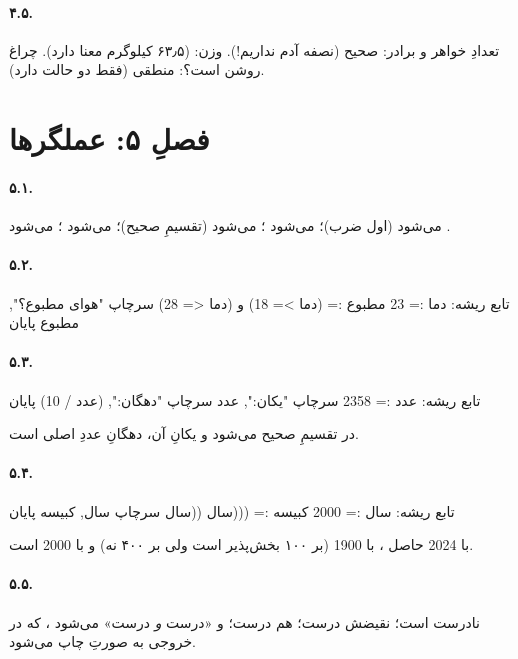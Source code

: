 \paragraph{۴.۵.} تعدادِ خواهر و برادر: صحیح (نصفه آدم نداریم!). وزن:
 (۶۳٫۵ کیلوگرم معنا دارد). چراغ روشن است؟: منطقی (فقط دو حالت دارد).

\section*{فصلِ ۵: عملگرها}

\paragraph{۵.۱.}  می‌شود  (اول ضرب)؛
 می‌شود ؛  می‌شود 
(تقسیمِ صحیح)؛  می‌شود ؛  می‌شود
.

\paragraph{۵.۲.}
\begin{salamfa}
تابع ریشه:
    دما := 23
    مطبوع := (دما >= 18) و (دما <= 28)
    سرچاپ "هوای مطبوع؟", مطبوع
پایان
\end{salamfa}

\paragraph{۵.۳.}
\begin{salamfa}
تابع ریشه:
    عدد := 2358
    سرچاپ "یکان:", عدد %
    سرچاپ "دهگان:", (عدد / 10) %
پایان
\end{salamfa}
 در تقسیمِ صحیح می‌شود  و یکانِ آن، دهگانِ عددِ
اصلی است.

\paragraph{۵.۴.}
\begin{salamfa}
تابع ریشه:
    سال := 2000
    کبیسه := (((سال %
                    ((سال %
    سرچاپ سال, کبیسه
پایان
\end{salamfa}
با 2024 حاصل ، با 1900  (بر ۱۰۰ بخش‌پذیر است
ولی بر ۴۰۰ نه) و با 2000  است.

\paragraph{۵.۵.}  نادرست است؛ نقیضش درست؛  هم
درست؛ و «درست \emph{و} درست» می‌شود ، که در خروجی به صورتِ
 چاپ می‌شود.

